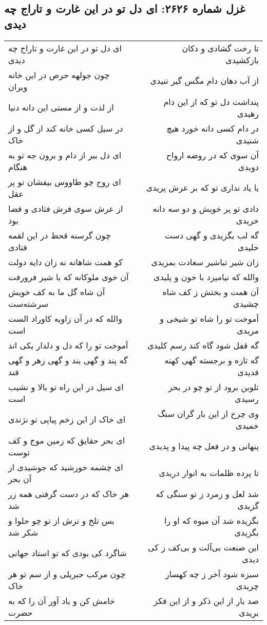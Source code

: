 \begin{center}
\section*{غزل شماره ۲۶۲۶: ای دل تو در این غارت و تاراج چه دیدی}
\label{sec:2626}
\begin{longtable}{l p{0.5cm} r}
ای دل تو در این غارت و تاراج چه دیدی
&&
تا رخت گشادی و دکان بازکشیدی
\\
چون جولهه حرص در این خانه ویران
&&
از آب دهان دام مگس گیر تنیدی
\\
از لذت و از مستی این دانه دنیا
&&
پنداشت دل تو که از این دام رهیدی
\\
در سیل کسی خانه کند از گل و از خاک
&&
در دام کسی دانه خورد هیچ شنیدی
\\
ای دل ببر از دام و برون جه تو به هنگام
&&
آن سوی که در روضه ارواح دویدی
\\
ای روح چو طاووس بیفشان تو پر عقل
&&
یا یاد نداری تو که بر عرش پریدی
\\
از عرش سوی فرش فتادی و قضا بود
&&
دادی تو پر خویش و دو سه دانه خریدی
\\
چون گرسنه قحط در این لقمه فتادی
&&
گه لب بگزیدی و گهی دست خلیدی
\\
کو همت شاهانه نه زان دایه دولت
&&
زان شیر تباشیر سعادت بمزیدی
\\
آن خوی ملوکانه که با شیر فرورفت
&&
والله که نیامیزد با خون و پلیدی
\\
آن شاه گل ما به کف خویش سرشته‌ست
&&
آن همت و بختش ز کف شاه چشیدی
\\
والله که در آن زاویه کاوراد الست است
&&
آموخت تو را شاه تو شیخی و مریدی
\\
آموخت تو را که دل و دلدار یکی اند
&&
گه قفل شود گاه کند رسم کلیدی
\\
گه پند و گهی بند و گهی زهر و گهی قند
&&
گه تازه و برجسته گهی کهنه قدیدی
\\
ای سیل در این راه تو بالا و نشیب است
&&
تلوین برود از تو چو در بحر رسیدی
\\
ای خاک از این زخم پیاپی تو نژندی
&&
وی چرخ از این بار گران سنگ خمیدی
\\
ای بحر حقایق که زمین موج و کف توست
&&
پنهانی و در فعل چه پیدا و پدیدی
\\
ای چشمه خورشید که جوشیدی از آن بحر
&&
تا پرده ظلمات به انوار دریدی
\\
هر خاک که در دست گرفتی همه زر شد
&&
شد لعل و زمرد ز تو سنگی که گزیدی
\\
بس تلخ و ترش از تو چو حلوا و شکر شد
&&
بگزیده شد آن میوه که او را بگزیدی
\\
شاگرد کی بودی که تو استاد جهانی
&&
این صنعت بی‌آلت و بی‌کف ز کی دیدی
\\
چون مرکب جبریلی و از سم تو هر خاک
&&
سبزه شود آخر ز چه کهسار چریدی
\\
خامش کن و یاد آور آن را که به حضرت
&&
صد بار از این ذکر و از این فکر بریدی
\\
\end{longtable}
\end{center}
